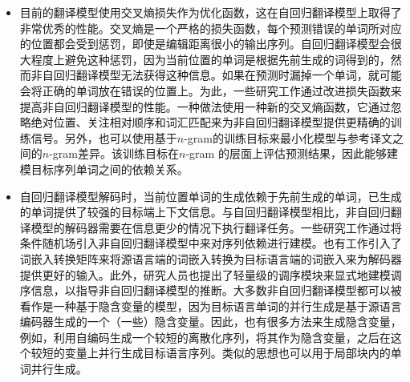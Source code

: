 \begin{itemize}
\vspace{0.5em}
\item 目前的翻译模型使用交叉熵损失作为优化函数，这在自回归翻译模型上取得了非常优秀的性能。交叉熵是一个严格的损失函数，每个预测错误的单词所对应的位置都会受到惩罚，即使是编辑距离很小的输出序列。自回归翻译模型会很大程度上避免这种惩罚，因为当前位置的单词是根据先前生成的词得到的，然而非自回归翻译模型无法获得这种信息。如果在预测时漏掉一个单词，就可能会将正确的单词放在错误的位置上。为此，一些研究工作通过改进损失函数来提高非自回归翻译模型的性能。一种做法使用一种新的交叉熵函数，它通过忽略绝对位置、关注相对顺序和词汇匹配来为非自回归翻译模型提供更精确的训练信号。另外，也可以使用基于$n$-gram的训练目标来最小化模型与参考译文之间的$n$-gram差异。该训练目标在$n$-gram 的层面上评估预测结果，因此能够建模目标序列单词之间的依赖关系。
\vspace{0.5em}
\item 自回归翻译模型解码时，当前位置单词的生成依赖于先前生成的单词，已生成的单词提供了较强的目标端上下文信息。与自回归翻译模型相比，非自回归翻译模型的解码器需要在信息更少的情况下执行翻译任务。一些研究工作通过将条件随机场引入非自回归翻译模型中来对序列依赖进行建模。也有工作引入了词嵌入转换矩阵来将源语言端的词嵌入转换为目标语言端的词嵌入来为解码器提供更好的输入。此外，研究人员也提出了轻量级的调序模块来显式地建模调序信息，以指导非自回归翻译模型的推断。大多数非自回归翻译模型都可以被看作是一种基于隐含变量的模型，因为目标语言单词的并行生成是基于源语言编码器生成的一个（一些）隐含变量。因此，也有很多方法来生成隐含变量，例如，利用自编码生成一个较短的离散化序列，将其作为隐含变量，之后在这个较短的变量上并行生成目标语言序列。类似的思想也可以用于局部块内的单词并行生成。
\vspace{0.5em}
\end{itemize}








